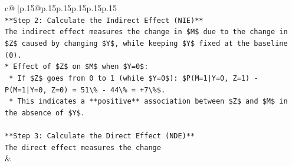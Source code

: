 \documentclass{article}
\begin{document}
{\begin{supertabular}{c@{$\;$}|p{.15\linewidth}@{}p{.15\linewidth}p{.15\linewidth}p{.15\linewidth}p{.15\linewidth}p{.15\linewidth}}
{{{\\ 
\texttt{**Step 2: Calculate the Indirect Effect (NIE)**} \\
\texttt{The indirect effect measures the change in \$M\$ due to the change in \$Z\$ caused by changing \$Y\$, while keeping \$Y\$ fixed at the baseline (0).} \\
\texttt{*   Effect of \$Z\$ on \$M\$ when \$Y=0\$:} \\
\texttt{    *   If \$Z\$ goes from 0 to 1 (while \$Y=0\$): \$P(M=1|Y=0, Z=1) {-} P(M=1|Y=0, Z=0) = 51\textbackslash{}\% {-} 44\textbackslash{}\% = +7\textbackslash{}\%\$.} \\
\texttt{    *   This indicates a **positive** association between \$Z\$ and \$M\$ in the absence of \$Y\$.} \\
\\ 
\texttt{**Step 3: Calculate the Direct Effect (NDE)**} \\
\texttt{The direct effect measures the change} \\
            }
        }
    }
    & \\ \\


\end{supertabular}}
\end{document}
